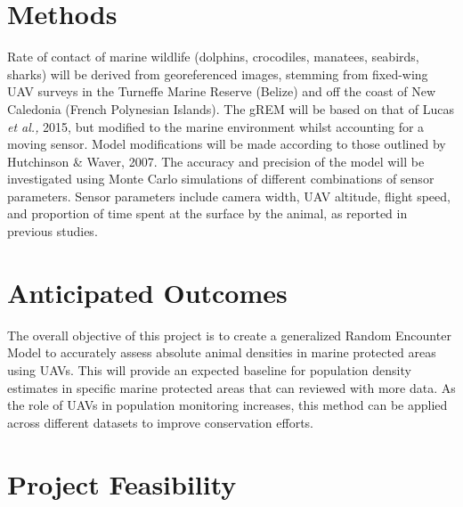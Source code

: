 \documentclass[11pt]{article}
\begin{document}
\section{Methods}
Rate of contact of marine wildlife (dolphins, crocodiles, manatees, seabirds, sharks) will be derived from georeferenced images, stemming from fixed-wing UAV surveys in the Turneffe Marine Reserve (Belize) and off the coast of New Caledonia (French Polynesian Islands). The gREM will be based on that of Lucas \textit{et al.,} 2015, but modified to the marine environment whilst accounting for a moving sensor. Model modifications will be made according to those outlined by Hutchinson \& Waver, 2007. The accuracy and precision of the model will be investigated using Monte Carlo simulations of different combinations of sensor parameters. Sensor parameters include camera width, UAV altitude, flight speed, and proportion of time spent at the surface by the animal, as reported in previous studies. 



\section{Anticipated Outcomes}
The overall objective of this project is to create a generalized Random Encounter Model to accurately assess absolute animal densities in marine protected areas using UAVs. This will provide an expected baseline for population density estimates in specific marine protected areas that can reviewed with more data. As the role of UAVs in population monitoring increases, this method can be applied across different datasets to improve conservation efforts.


\section{Project Feasibility}
\end{document}
